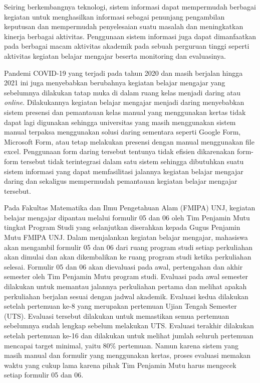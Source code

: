 	Seiring berkembangnya teknologi, sistem informasi dapat mempermudah berbagai kegiatan untuk menghasilkan informasi sebagai penunjang pengambilan keputusan dan mempermudah penyelesaian suatu masalah dan meningkatkan kinerja berbagai aktivitas. Penggunaan sistem informasi juga dapat dimanfaatkan pada berbagai macam aktivitas akademik pada sebuah perguruan tinggi seperti aktivitas kegiatan belajar mengajar beserta monitoring dan evaluasinya.

	Pandemi COVID-19 yang terjadi pada tahun 2020 dan masih berjalan hingga 2021 ini juga menyebabkan berubahnya kegiatan belajar mengajar yang sebelumnya dilakukan tatap muka di dalam ruang kelas menjadi daring atau \textit{online}. Dilakukannya kegiatan belajar mengajar menjadi daring menyebabkan sistem presensi dan pemantauan kelas manual yang menggunakan kertas tidak dapat lagi digunakan sehingga universitas yang masih menggunakan sistem manual terpaksa menggunakan solusi daring sementara seperti Google Form, Microsoft Form, atau tetap melakukan presensi dengan manual menggunakan file excel. Penggunaan form daring tersebut tentunya tidak efisien dikarenakan form-form tersebut tidak terintegrasi dalam satu sistem sehingga dibutuhkan suatu sistem informasi yang dapat memfasilitasi jalannya kegiatan belajar mengajar daring dan sekaligus mempermudah pemantauan kegiatan belajar mengajar tersebut.

	Pada Fakultas Matematika dan Ilmu Pengetahuan Alam (FMIPA) UNJ, kegiatan belajar mengajar dipantau melalui formulir 05 dan 06 oleh Tim Penjamin Mutu tingkat Program Studi yang selanjutkan diserahkan kepada Gugus Penjamin Mutu FMIPA UNJ. Dalam menjalankan kegiatan belajar mengajar, mahasiswa akan mengambil formulir 05 dan 06 dari ruang program studi setiap perkuliahan akan dimulai dan akan dikembalikan ke ruang program studi ketika perkuliahan selesai. Formulir 05 dan 06 akan dievaluasi pada awal, pertengahan dan akhir semester oleh Tim Penjamin Mutu program studi. Evaluasi pada awal semester dilakukan untuk memantau jalannya perkuliahan pertama dan melihat apakah perkuliahan berjalan sesuai dengan jadwal akademik. Evaluasi kedua dilakukan setelah pertemuan ke-8 yang merupakan pertemuan Ujian Tengah Semester (UTS). Evaluasi tersebut dilakukan untuk memastikan semua pertemuan sebelumnya sudah lengkap sebelum melakukan UTS. Evaluasi terakhir dilakukan setelah pertemuan ke-16 dan dilakukan untuk melihat jumlah seluruh pertemuan mencapai target minimal, yaitu 80\% pertemuan. Namun karena sistem yang masih manual dan formulir yang menggunakan kertas, proses evaluasi memakan waktu yang cukup lama karena pihak Tim Penjamin Mutu harus mengecek setiap formulir 05 dan 06.

